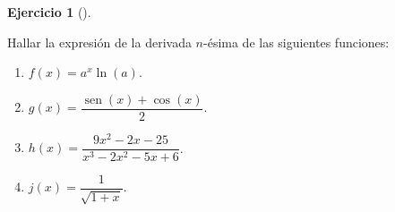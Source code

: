 \documentclass[
  spanish,
  a4paper,
]{scrreport}
\providecommand{\tightlist}{%
  \setlength{\itemsep}{0pt}\setlength{\parskip}{0pt}}
\theoremstyle{definition}
\newtheorem{exercise}{Ejercicio}[chapter]
\theoremstyle{remark}
\begin{document}
\begin{exercise}[]\protect\hypertarget{exr-derivadas-orden-n}{}\label{exr-derivadas-orden-n}

Hallar la expresión de la derivada \(n\)-ésima de las siguientes
funciones:

\begin{enumerate}
\def\labelenumi{\alph{enumi}.}
\tightlist
\item
  \(f(x)=a^x\ln(a)\).
\item
  \(g(x)=\dfrac{\operatorname{sen}(x)+\cos(x)}{2}\).
\item
  \(h(x)=\dfrac{9x^2-2x-25}{x^3-2x^2-5x+6}\).
\item
  \(j(x)=\dfrac{1}{\sqrt{1+x}}\).
\end{enumerate}

\end{exercise}
\end{document}
